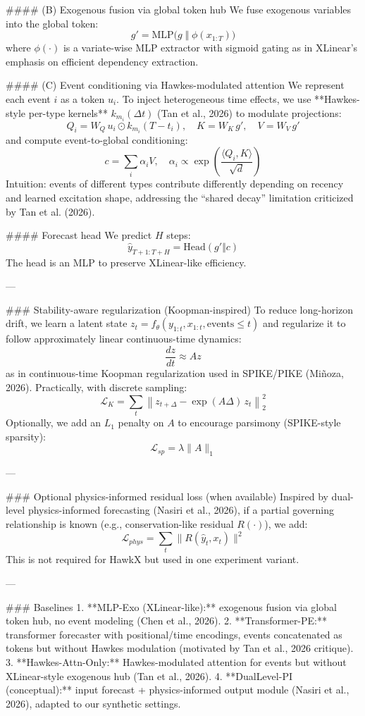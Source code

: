 #### (B) Exogenous fusion via global token hub  
We fuse exogenous variables into the global token:
\[
g' = \mathrm{MLP}\Big(g \;\Vert\; \phi(x_{1:T})\Big)
\]
where \(\phi(\cdot)\) is a variate-wise MLP extractor with sigmoid gating as in XLinear’s emphasis on efficient dependency extraction.

#### (C) Event conditioning via Hawkes-modulated attention  
We represent each event \(i\) as a token \(u_i\). To inject heterogeneous time effects, we use **Hawkes-style per-type kernels** \(k_{m_i}(\Delta t)\) (Tan et al., 2026) to modulate projections:
\[
Q_i = W_Q \, u_i \odot k_{m_i}(T - t_i), \quad
K = W_K \, g' , \quad
V = W_V \, g'
\]
and compute event-to-global conditioning:
\[
c = \sum_i \alpha_i V, \quad
\alpha_i \propto \exp\left(\frac{\langle Q_i, K\rangle}{\sqrt{d}}\right)
\]
Intuition: events of different types contribute differently depending on recency and learned excitation shape, addressing the “shared decay” limitation criticized by Tan et al. (2026).

#### Forecast head  
We predict \(H\) steps:
\[
\hat{y}_{T+1:T+H} = \mathrm{Head}(g' \Vert c)
\]
The head is an MLP to preserve XLinear-like efficiency.

---

### Stability-aware regularization (Koopman-inspired)  
To reduce long-horizon drift, we learn a latent state \(z_t = f_\theta(y_{1:t}, x_{1:t}, \text{events}\le t)\) and regularize it to follow approximately linear continuous-time dynamics:
\[
\frac{dz}{dt} \approx A z
\]
as in continuous-time Koopman regularization used in SPIKE/PIKE (Miñoza, 2026). Practically, with discrete sampling:
\[
\mathcal{L}_{K} = \sum_{t} \left\| z_{t+\Delta} - \exp(A\Delta)\, z_t \right\|_2^2
\]
Optionally, we add an \(L_1\) penalty on \(A\) to encourage parsimony (SPIKE-style sparsity):
\[
\mathcal{L}_{sp} = \lambda \|A\|_1
\]

---

### Optional physics-informed residual loss (when available)  
Inspired by dual-level physics-informed forecasting (Nasiri et al., 2026), if a partial governing relationship is known (e.g., conservation-like residual \(R(\cdot)\)), we add:
\[
\mathcal{L}_{phys} = \sum_{t} \|R(\hat{y}_t, x_t)\|^2
\]
This is not required for HawkX but used in one experiment variant.

---

### Baselines  
1. **MLP-Exo (XLinear-like):** exogenous fusion via global token hub, no event modeling (Chen et al., 2026).  
2. **Transformer-PE:** transformer forecaster with positional/time encodings, events concatenated as tokens but without Hawkes modulation (motivated by Tan et al., 2026 critique).  
3. **Hawkes-Attn-Only:** Hawkes-modulated attention for events but without XLinear-style exogenous hub (Tan et al., 2026).  
4. **DualLevel-PI (conceptual):** input forecast + physics-informed output module (Nasiri et al., 2026), adapted to our synthetic settings.


